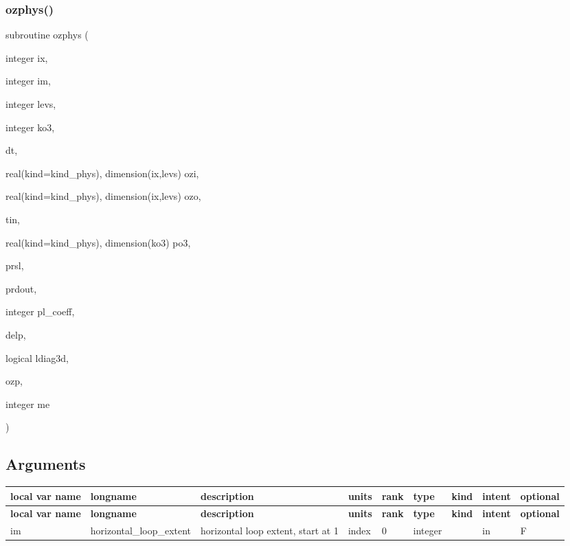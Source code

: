 \subsubsection{\texorpdfstring{ozphys()}{ozphys()}}
{\footnotesize\ttfamily subroutine ozphys (\begin{DoxyParamCaption}\item[{integer}]{ix,  }\item[{integer}]{im,  }\item[{integer}]{levs,  }\item[{integer}]{ko3,  }\item[{}]{dt,  }\item[{real(kind=kind\+\_\+phys), dimension(ix,levs)}]{ozi,  }\item[{real(kind=kind\+\_\+phys), dimension(ix,levs)}]{ozo,  }\item[{}]{tin,  }\item[{real(kind=kind\+\_\+phys), dimension(ko3)}]{po3,  }\item[{}]{prsl,  }\item[{}]{prdout,  }\item[{integer}]{pl\+\_\+coeff,  }\item[{}]{delp,  }\item[{logical}]{ldiag3d,  }\item[{}]{ozp,  }\item[{integer}]{me }\end{DoxyParamCaption})}

\hypertarget{group___g_f_s__ozn_arg_table_ozphys_run}{}\subsection{Arguments}\label{group___g_f_s__ozn_arg_table_ozphys_run}
\tabulinesep=1mm
\begin{longtabu} spread 0pt [c]{*{9}{|X[-1]}|}
\hline
\rowcolor{\tableheadbgcolor}\textbf{ local var name }&\textbf{ longname }&\textbf{ description }&\textbf{ units }&\textbf{ rank }&\textbf{ type }&\textbf{ kind }&\textbf{ intent }&\textbf{ optional  }\\
\endfirsthead
\hline
\endfoot
\hline
\rowcolor{\tableheadbgcolor}\textbf{ local var name }&\textbf{ longname }&\textbf{ description }&\textbf{ units }&\textbf{ rank }&\textbf{ type }&\textbf{ kind }&\textbf{ intent }&\textbf{ optional  }\\
\endhead
im &horizontal\+\_\+loop\+\_\+extent &horizontal loop extent, start at 1 &index &0 &integer &&in &F \\
\end{longtabu}

